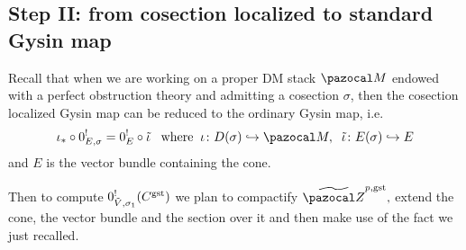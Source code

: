\documentclass[11pt]{amsart}
\renewcommand{\to}{\rightarrow}
\newcommand{\XP}{\pazocal{X\!P}}
\newcommand{\hL}{\hat{\mathcal L}}
\newcommand{\Z}{\pazocal Z}
\newcommand{\tZ}{\widetilde{\pazocal Z}}
\newcommand{\R}{\operatorname{R}}
\theoremstyle{plain}
\theoremstyle{definition}
\begin{document}

\subsection*{Step II: from cosection localized to standard Gysin map}
Recall that when we are working on a proper DM stack $\pazocal M$ endowed with a perfect obstruction theory and admitting a cosection $\sigma$, then the cosection localized Gysin map can be reduced to the ordinary Gysin map, i.e.
\[\iota_*\circ 0^{!}_{E,\sigma}=0_E^{!}\circ \tilde{\iota}\;\;\;\text{where}\;\;\iota\colon D(\sigma)\hookrightarrow\pazocal M,\;\;\tilde{\iota}\colon E(\sigma)\hookrightarrow E\]
and $E$ is the vector bundle containing the cone.

Then to compute $0^!_{\tilde V,\sigma_1}(C^{\rm{gst}})$ we plan to compactify $\tZ^{p,\rm{gst}},$ extend the cone, the vector bundle and the section over it and then make use of the fact we just recalled.
\end{document}
